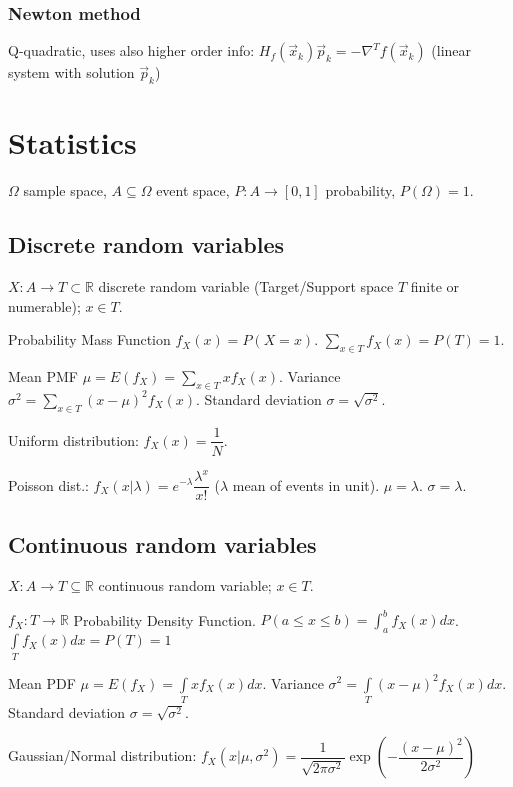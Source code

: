 \documentclass[]{article}
\begin{document}
	
	\subsubsection{Newton method}
	
	Q-quadratic, uses also higher order info:
	$H_f(\vec{x}_k)\vec{p}_k = -\nabla^T f(\vec{x}_k)$ (linear system with solution $\vec{p}_k$)
	
	
	\section{Statistics}
	
	$\Omega$ sample space, $A \subseteq \Omega$ event space, $P:A\to[0,1]$ probability, $P(\Omega)=1$.
	
	\subsection{Discrete random variables}
	
	$X:A\to T\subset\mathbb{R}$ discrete random variable (Target/Support space $T$ finite or numerable); $x\in T$.
	
	Probability Mass Function $f_X(x) = P(X=x)$.
	$\sum\limits_{x \in T} f_X(x) = P(T) = 1$.
	
	Mean PMF $\mu=E(f_X)=\sum\limits_{x \in T}x f_X(x)$.
	Variance $\sigma^2 = \sum\limits_{x \in T} (x-\mu)^2 f_X(x)$.
	Standard deviation $\sigma=\sqrt{\sigma^2}$.
	
	Uniform distribution: $f_X(x)=\dfrac{1}{N}$.
	
	Poisson dist.: $f_X(x|\lambda)=e^{-\lambda}\dfrac{\lambda^x}{x!}$ ($\lambda$ mean of events in unit).
	$\mu=\lambda$. $\sigma=\lambda$.
	
	\subsection{Continuous random variables}
	
	$X:A\to T\subseteq\mathbb{R}$ continuous random variable; $x\in T$.
	
	$f_X:T\to\mathbb{R}$ Probability Density Function.
	$P(a\le x\le b) = \int_{a}^{b}f_X(x)dx$.
	$\int\limits_T f_X(x) dx = P(T) = 1$
	
	Mean PDF $\mu = E(f_X) = \int\limits_T x f_X(x) dx$.
	Variance $\sigma^2 = \int\limits_T (x-\mu)^2 f_X(x)dx$.
	Standard deviation $\sigma=\sqrt{\sigma^2}$.
	
	Gaussian/Normal distribution: $f_X(x|\mu,\sigma^2)=\dfrac{1}{\sqrt{2\pi\sigma^2}}\exp\left(-\dfrac{(x-\mu)^2}{2\sigma^2}\right)$
	
\end{document}
